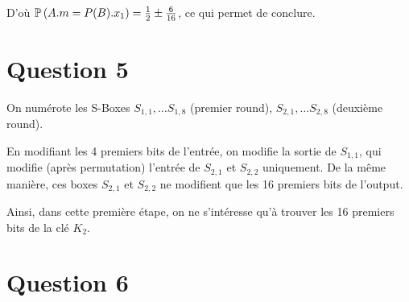 D'où $\mathbb{P}\left( A.m = P(B).x_1 \right) = \frac{1}{2} \pm \frac{6}{16}$, ce qui permet de conclure.

\section*{Question 5}

On numérote les S-Boxes $S_{1,1}, \dots S_{1,8}$ (premier round), $S_{2,1}, \dots S_{2,8}$ (deuxième round).

En modifiant les 4 premiers bits de l'entrée, on modifie la sortie de $S_{1,1}$, qui modifie (après permutation) l'entrée de $S_{2,1}$ et $S_{2,2}$ uniquement.
De la même manière, ces boxes $S_{2,1}$ et $S_{2,2}$ ne modifient que les 16 premiers bits de l'output.

Ainsi, dans cette première étape, on ne s'intéresse qu'à trouver les 16 premiers bits de la clé $K_2$.


\section*{Question 6}





